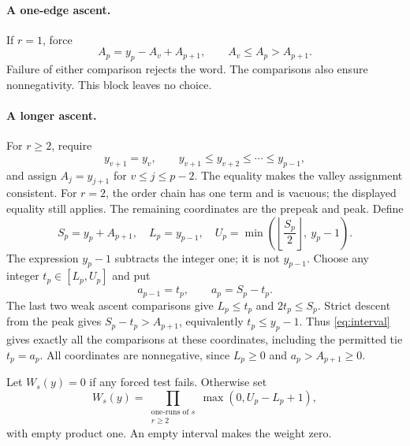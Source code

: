 \paragraph{A one-edge ascent.}
If $r=1$, force
\begin{equation}\label{eq:short-peak}
 A_p=y_p-A_v+A_{p+1},
 \qquad A_v\le A_p>A_{p+1}.
\end{equation}
Failure of either comparison rejects the word. The comparisons also
ensure nonnegativity. This block leaves no choice.

\paragraph{A longer ascent.}
For $r\ge2$, require
\begin{equation}\label{eq:ascent-tests}
 y_{v+1}=y_v,\qquad
 y_{v+1}\le y_{v+2}\le\cdots\le y_{p-1},
\end{equation}
and assign $A_j=y_{j+1}$ for $v\le j\le p-2$. The equality makes the
valley assignment consistent. For $r=2$, the order chain has one term
and is vacuous; the displayed equality still applies.
The remaining coordinates are the prepeak and peak. Define
\begin{equation}\label{eq:interval}
 S_p=y_p+A_{p+1},\quad L_p=y_{p-1},\quad
 U_p=\min\left(\left\lfloor\frac{S_p}{2}\right\rfloor,\ y_p-1\right).
\end{equation}
The expression $y_p-1$ subtracts the integer one; it is not $y_{p-1}$.
Choose any integer $t_p\in[L_p,U_p]$ and put
\begin{equation}\label{eq:pair}
 a_{p-1}=t_p,\qquad a_p=S_p-t_p.
\end{equation}
The last two weak ascent comparisons give $L_p\le t_p$ and
$2t_p\le S_p$. Strict descent from the peak gives
$S_p-t_p>A_{p+1}$, equivalently $t_p\le y_p-1$. Thus
\eqref{eq:interval} gives exactly all the comparisons at these coordinates,
including the permitted tie $t_p=a_p$. All coordinates are nonnegative,
since $L_p\ge0$ and $a_p>A_{p+1}\ge0$.

Let $W_s(y)=0$ if any forced test fails. Otherwise set
\begin{equation}\label{eq:weight}
 W_s(y)=\prod_{\substack{\text{one-runs of }s\\ r\ge2}}
             \max(0,U_p-L_p+1),
\end{equation}
with empty product one. An empty interval makes the weight zero.

